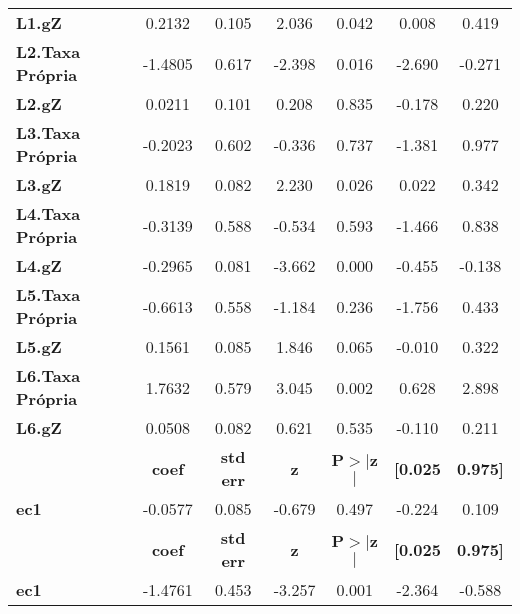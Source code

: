 \begin{center}
\begin{tabular}{lcccccc}
\textbf{L1.gZ}           &       0.2132  &        0.105     &     2.036  &         0.042        &        0.008    &        0.419     \\
\textbf{L2.Taxa Própria} &      -1.4805  &        0.617     &    -2.398  &         0.016        &       -2.690    &       -0.271     \\
\textbf{L2.gZ}           &       0.0211  &        0.101     &     0.208  &         0.835        &       -0.178    &        0.220     \\
\textbf{L3.Taxa Própria} &      -0.2023  &        0.602     &    -0.336  &         0.737        &       -1.381    &        0.977     \\
\textbf{L3.gZ}           &       0.1819  &        0.082     &     2.230  &         0.026        &        0.022    &        0.342     \\
\textbf{L4.Taxa Própria} &      -0.3139  &        0.588     &    -0.534  &         0.593        &       -1.466    &        0.838     \\
\textbf{L4.gZ}           &      -0.2965  &        0.081     &    -3.662  &         0.000        &       -0.455    &       -0.138     \\
\textbf{L5.Taxa Própria} &      -0.6613  &        0.558     &    -1.184  &         0.236        &       -1.756    &        0.433     \\
\textbf{L5.gZ}           &       0.1561  &        0.085     &     1.846  &         0.065        &       -0.010    &        0.322     \\
\textbf{L6.Taxa Própria} &       1.7632  &        0.579     &     3.045  &         0.002        &        0.628    &        2.898     \\
\textbf{L6.gZ}           &       0.0508  &        0.082     &     0.621  &         0.535        &       -0.110    &        0.211     \\
             & \textbf{coef} & \textbf{std err} & \textbf{z} & \textbf{P$> |$z$|$} & \textbf{[0.025} & \textbf{0.975]}  \\
\midrule
\textbf{ec1} &      -0.0577  &        0.085     &    -0.679  &         0.497        &       -0.224    &        0.109     \\
             & \textbf{coef} & \textbf{std err} & \textbf{z} & \textbf{P$> |$z$|$} & \textbf{[0.025} & \textbf{0.975]}  \\
\midrule
\textbf{ec1} &      -1.4761  &        0.453     &    -3.257  &         0.001        &       -2.364    &       -0.588     \\

\end{tabular}
\end{center}
